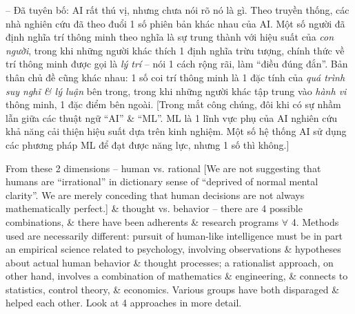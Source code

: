 \documentclass{article}
\begin{document}
\begin{itemize}
\begin{itemize}
\begin{itemize}
			-- Đã tuyên bố: AI rất thú vị, nhưng chưa nói rõ nó là gì. Theo truyền thống, các nhà nghiên cứu đã theo đuổi 1 số phiên bản khác nhau của AI. Một số người đã định nghĩa trí thông minh theo nghĩa là sự trung thành với hiệu suất của {\it con người}, trong khi những người khác thích 1 định nghĩa trừu tượng, chính thức về trí thông minh được gọi là {\it lý trí} -- nói 1 cách rộng rãi, làm ``điều đúng đắn''. Bản thân chủ đề cũng khác nhau: 1 số coi trí thông minh là 1 đặc tính của {\it quá trình suy nghĩ \& lý luận} bên trong, trong khi những người khác tập trung vào {\it hành vi} thông minh, 1 đặc điểm bên ngoài. [Trong mắt công chúng, đôi khi có sự nhầm lẫn giữa các thuật ngữ ``AI'' \& ``ML''. ML là 1 lĩnh vực phụ của AI nghiên cứu khả năng cải thiện hiệu suất dựa trên kinh nghiệm. Một số hệ thống AI sử dụng các phương pháp ML để đạt được năng lực, nhưng 1 số thì không.]
			
			From these 2 dimensions -- human vs. rational [We are not suggesting that humans are ``irrational'' in dictionary sense of ``deprived of normal mental clarity''. We are merely conceding that human decisions are not always mathematically perfect.] \& thought vs. behavior -- there are 4 possible combinations, \& there have been adherents \& research programs $\forall$ 4. Methods used are necessarily different: pursuit of human-like intelligence must be in part an empirical science related to psychology, involving observations \& hypotheses about actual human behavior \& thought processes; a rationalist approach, on other hand, involves a combination of mathematics \& engineering, \& connects to statistics, control theory, \& economics. Various groups have both disparaged \& helped each other. Look at 4 approaches in more detail.
			

\end{itemize}
\end{itemize}
\end{itemize}
\end{document}
